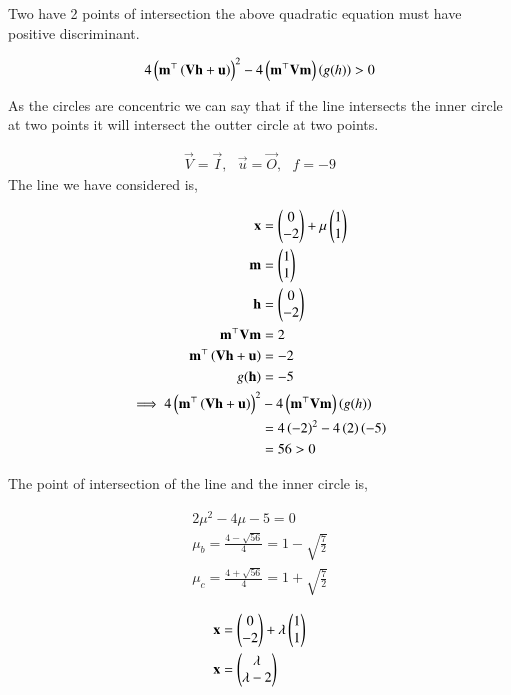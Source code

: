 \documentclass[journal,12pt,twocolumn]{IEEEtran}
\begin{document}
\begin{enumerate}
Two have 2 points of intersection the above quadratic equation must have positive discriminant.

		\begin{align}
			4\left(\mathbf{m}^{\top}\left(\mathbf{V}\mathbf{h}+\mathbf{u}\right)\right)^2-4\left(\mathbf{m}^{\top}\mathbf{V}\mathbf{m}\right)\left(g(h)\right)>0
		\end{align}

As the circles are concentric we can say that if the line intersects the inner circle at two points it will intersect the outter circle at two points.

		\begin{align}
			\vec{V} = \vec{I}, \text{ } \vec{u} = \vec{O}, \text{ } f = -9 
		\end{align}
The line we have considered is,

		\begin{align}
			\mathbf{x} &= \begin{pmatrix}0\\-2\end{pmatrix}+\mu\begin{pmatrix}1\\1\end{pmatrix}\\
			\mathbf{m} &= \begin{pmatrix}1\\1\end{pmatrix}\\
			\mathbf{h} &= \begin{pmatrix}0\\-2\end{pmatrix}\\
			\mathbf{m}^{\top}\mathbf{V}\mathbf{m} &= 2\\
			\mathbf{m}^{\top}\left(\mathbf{V}\mathbf{h}+\mathbf{u}\right)&=-2\\
			g(\mathbf{h}) &= -5\\
			\implies 4\left(\mathbf{m}^{\top}\left(\mathbf{V}\mathbf{h}+\mathbf{u}\right)\right)^2&-4\left(\mathbf{m}^{\top}\mathbf{V}\mathbf{m}\right)\left(g(h)\right)\\
			&=4\left(-2\right)^2-4\left(2\right)\left(-5\right)\\
			&=56>0
		\end{align}


The point of intersection of the line and the inner circle is,

		\begin{align}
			2\mu^2-4\mu-5=0\\
			\mu_b = \frac{4-\sqrt{56}}{4} = 1-\sqrt{\frac{7}{2}}\\
			\mu_c = \frac{4+\sqrt{56}}{4} = 1+\sqrt{\frac{7}{2}}
		\end{align}

		\begin{align}
			\mathbf{x} &= \begin{pmatrix}0\\-2\end{pmatrix}+\lambda \begin{pmatrix}1\\1\end{pmatrix}\\
			\mathbf{x} &= \begin{pmatrix}\lambda \\ \lambda - 2\end{pmatrix}
		\end{align}


\end{enumerate}
\end{document}
